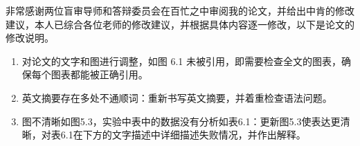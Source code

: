\begin{advice}

非常感谢两位盲审导师和答辩委员会在百忙之中审阅我的论文，并给出中肯的修改建议，本人已综合各位老师的修改建议，并根据具体内容逐一修改，以下是论文的修改说明。

\begin{enumerate}
\item 对论文的文字和图进行调整，如图 6.1 未被引用，即需要检查全文的图表，确保每个图表都能被正确引用。 
\item 英文摘要存在多处不通顺词：重新书写英文摘要，并着重检查语法问题。
\item 图不清晰如图5.3，实验中表中的数据没有分析如表6.1：更新图5.3使表达更清晰，对表6.1在下方的文字描述中详细描述失败情况，并作出解释。
\end{enumerate}

\end{advice}

